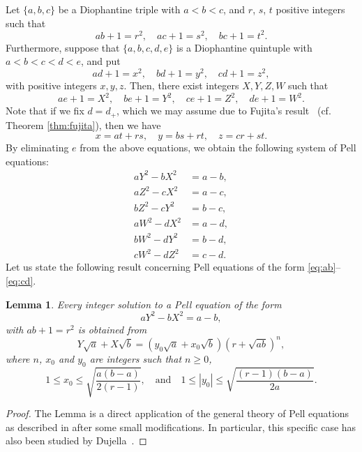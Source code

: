 \documentclass{amsart}
\newtheorem{lemma}{Lemma}
\theoremstyle{definition}
\begin{document}
Let $\{a, b, c\}$ be a Diophantine triple with $a < b < c$, and $r$, $s$, $t$ positive integers such that
$$
ab + 1 = r^2, \quad ac + 1 = s^2,\quad bc + 1 = t^2. 
$$
Furthermore, suppose that $\{a, b, c, d, e\}$ is a Diophantine quintuple with $a < b < c < d < e$, and put
$$ad + 1 = x^2,\quad  bd + 1 = y^2,\quad cd + 1 = z^2,$$
with positive integers $x, y, z$. Then, there exist integers $X,Y,Z,W$ such that
$$
ae + 1 = X^2,\quad be + 1 = Y^2,\quad ce + 1 = Z^2,\quad de + 1 = W^2. 
$$
Note that if we fix $d=d_{+}$, which we may assume due to Fujita's result~\cite{Fujita-1} (cf. Theorem \ref{thm:fujita}), then we have
$$
x= at+rs,\quad y= bs +rt, \quad z=cr+st.
$$
By eliminating $e$ from the above equations, we obtain the following system of Pell equations:
\begin{align}\label{eq:ab}
 aY^2 - bX^2 &= a - b,\\\label{eq:ac}
 aZ^2 - cX^2 &= a - c,\\\label{eq:bc}
 bZ^2 - cY^2 &= b - c,\\\label{eq:ad}
 aW^2 - dX^2 &= a - d,\\\label{eq:bd}
 bW^2 - dY^2 &= b - d,\\\label{eq:cd}
 cW^2 - dZ^2 &= c - d. 
\end{align}
Let us state the following result concerning Pell equations of the form \eqref{eq:ab}--\eqref{eq:cd}.

\begin{lemma}\label{lem:boundsx_0y_0}
 Every integer solution to a Pell equation of the form
 $$ aY^2-bX^2=a-b,$$
 with $ab+1=r^2$ is obtained from
 $$Y \sqrt{a} + X \sqrt{b} = (y_0 \sqrt{a} + x_0 \sqrt{b})(r+\sqrt{ab})^{n},$$
 where $n$, $x_0$ and $y_0$ are integers such that $n\geq 0$,
 $$1\leq x_0 \leq \sqrt{\frac{a(b-a)}{2(r-1)}},\quad \text{and} \quad 1\leq |y_0| \leq \sqrt{\frac{(r-1)(b-a)}{2a}}.$$
\end{lemma}

\begin{proof}
 The Lemma is a direct application of the general theory of Pell equations as described in \cite[Theorem 108a]{Nagell}
 after some small modifications. In particular, this specific case  has also been studied by Dujella~\cite[Lemma 1]{Dujella:2001}.
\end{proof}
\end{document}
